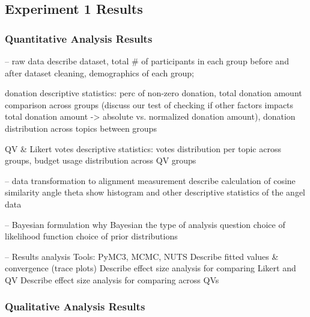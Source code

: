 \subsection{Experiment 1 Results} \label{results-1}
\subsubsection{Quantitative Analysis Results}

-- raw data
    describe dataset, total # of participants in each group before and after dataset cleaning, demographics of each group;
    
    donation descriptive statistics: perc of non-zero donation, total donation amount comparison across groups (discuss our test of checking if other factors impacts total donation amount -> absolute vs. normalized donation amount), donation distribution across topics between groups
    
    QV & Likert votes descriptive statistics: votes distribution per topic across groups, budget usage distribution across QV groups
    
-- data transformation to alignment measurement
    describe calculation of cosine similarity angle theta
    show histogram and other descriptive statistics of the angel data
    
-- Bayesian formulation
    why Bayesian
    the type of analysis question
    choice of likelihood function
    choice of prior distributions
    
-- Results analysis
    Tools: PyMC3, MCMC, NUTS
    Describe fitted values & convergence (trace plots)
    Describe effect size analysis for comparing Likert and QV
    Describe effect size analysis for comparing across QVs
    
\subsubsection{Qualitative Analysis Results}